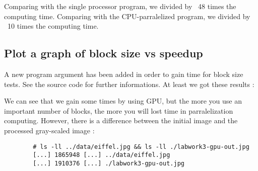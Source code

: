 \documentclass{article}
\begin{document}
    Comparing with the single processor program, we divided by ~48 times the computing time. 
    Comparing with the CPU-parralelized program, we divided by ~10 times the computing time. 
    
\subsection{Plot a graph of block size vs speedup}
    A new program argument has been added in order to gain time for block size tests. See the source code for further informations. 
    \newline
    At least we got these results :
    \newline
    \newline
    We can see that we gain some times by using GPU, but the more you use an important number of blocks, the more you will lost time in parralelization computing. 
    \newLine 
    However, there is a difference between the initial image and the processed gray-scaled image : 
    
    \begin{verbatim}
        # ls -ll ../data/eiffel.jpg && ls -ll ./labwork3-gpu-out.jpg
        [...] 1865948 [...] ../data/eiffel.jpg
        [...] 1910376 [...] ./labwork3-gpu-out.jpg

    \end{verbatim}
    
\end{document}
